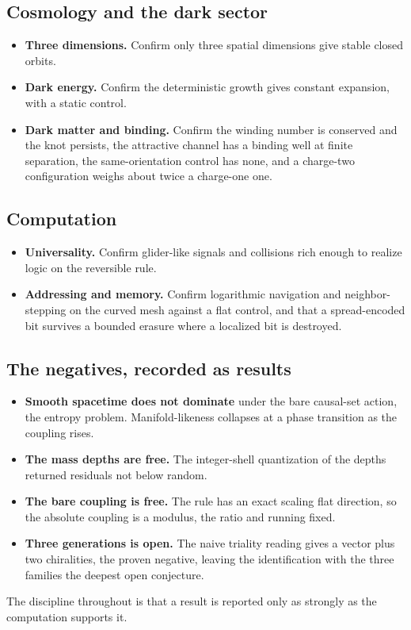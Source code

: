 \subsection*{Cosmology and the dark sector}

\begin{itemize}
\item \textbf{Three dimensions.} Confirm only three spatial dimensions give stable closed orbits.
\item \textbf{Dark energy.} Confirm the deterministic growth gives constant expansion, with a static control.
\item \textbf{Dark matter and binding.} Confirm the winding number is conserved and the knot persists, the attractive channel has a binding well at finite separation, the same-orientation control has none, and a charge-two configuration weighs about twice a charge-one one.
\end{itemize}

\subsection*{Computation}

\begin{itemize}
\item \textbf{Universality.} Confirm glider-like signals and collisions rich enough to realize logic on the reversible rule.
\item \textbf{Addressing and memory.} Confirm logarithmic navigation and neighbor-stepping on the curved mesh against a flat control, and that a spread-encoded bit survives a bounded erasure where a localized bit is destroyed.
\end{itemize}

\subsection*{The negatives, recorded as results}

\begin{itemize}
\item \textbf{Smooth spacetime does not dominate} under the bare causal-set action, the entropy problem. Manifold-likeness collapses at a phase transition as the coupling rises.
\item \textbf{The mass depths are free.} The integer-shell quantization of the depths returned residuals not below random.
\item \textbf{The bare coupling is free.} The rule has an exact scaling flat direction, so the absolute coupling is a modulus, the ratio and running fixed.
\item \textbf{Three generations is open.} The naive triality reading gives a vector plus two chiralities, the proven negative, leaving the identification with the three families the deepest open conjecture.
\end{itemize}

The discipline throughout is that a result is reported only as strongly as the computation supports it.

